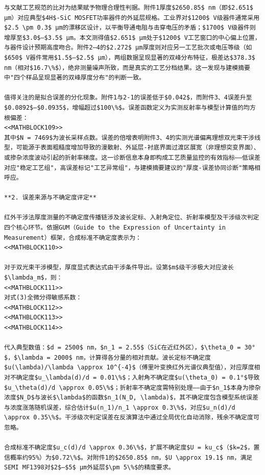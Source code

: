 \documentclass{mcmthesis}
\begin{document}
\begin{table}[htbp]
\begin{lstlisting}
与文献工艺规范的比对为结果赋予物理合理性判据。附件1厚度$2650.85$ nm（即$2.651$ μm）对应典型$4H$-SiC MOSFET功率器件的外延层规格。工业界对$1200$ V级器件通常采用$2.5 \pm 0.3$ μm的漂移区设计，以平衡导通电阻与击穿电压的矛盾；$1700$ V级器件则增厚至$3.0$–$3.5$ μm。本文测得值$2.651$ μm处于$1200$ V工艺窗口的中心偏上位置，与器件设计预期高度吻合。附件2–4的$2.272$ μm厚度则对应另一工艺批次或电压等级（如$650$ V器件常用$1.5$–$2.5$ μm），两组数据呈现显著的双峰分布特征，极差达$378.3$ nm（相对$16.7\%$），绝非测量噪声所致，而是真实的工艺分档结果。这一发现与建模摘要中"四个样品呈现显著的双峰厚度分布"的判断一致。

值得关注的是拟合误差的分化现象。附件1与2-1的误差低于$0.042$，而附件3、4误差升至$0.0892$–$0.0935$，增幅超过$100\%$。误差函数定义为实测反射率与模型计算值的均方根偏差：
<<MATHBLOCK109>>
其中$N = 7469$为波长采样点数。误差的倍增表明附件3、4的实测光谱偏离理想双光束干涉线型，可能源于表面粗糙度增加导致的漫散射、外延层-衬底界面过渡区展宽（非理想突变界面）、或掺杂浓度波动引起的折射率梯度。这一诊断信息本身即构成工艺质量监控的有效指标——低误差对应"稳定工艺组"，高误差标记"工艺异常组"，与建模摘要建议的"厚度-误差协同诊断"策略相呼应。

**2. 误差来源与不确定度评定**

红外干涉法厚度测量的不确定度传播链涉及波长定标、入射角定位、折射率模型及干涉级次判定四个核心环节。依据GUM（Guide to the Expression of Uncertainty in Measurement）框架，合成标准不确定度表示为：
<<MATHBLOCK110>>

对于双光束干涉模型，厚度显式表达式由干涉条件导出。设第$m$级干涉极大对应波长$\lambda_m$，则：
<<MATHBLOCK111>>
对式(3)全微分得敏感系数：
<<MATHBLOCK112>>
<<MATHBLOCK113>>
<<MATHBLOCK114>>

代入典型数值：$d = 2500$ nm，$n_1 = 2.55$（SiC在近红外区），$\theta_0 = 30°$，$\lambda = 2000$ nm，计算得各分量的相对贡献。波长定标不确定度$u(\lambda)/\lambda \approx 10^{-4}$（傅里叶变换红外光谱仪典型值），对应厚度相对不确定度$u_\lambda(d)/d = 0.01\%$；入射角不确定度$u(\theta_0) = 0.1°$导致$u_\theta(d)/d \approx 0.05\%$；折射率不确定度需特别处理——由于$n_1$本身为掺杂浓度$N_D$与波长$\lambda$的函数$n_1(N_D, \lambda)$，其不确定度包含模型系统误差与浓度涨落随机误差，综合估计$u(n_1)/n_1 \approx 0.3\%$，对应$u_n(d)/d \approx 0.35\%$。干涉级次判定误差在反演算法中通过全局优化自动消除，残余不确定度可忽略。

合成标准不确定度$u_c(d)/d \approx 0.36\%$，扩展不确定度$U = ku_c$（$k=2$，置信概率约95%）为$0.72\%$。对附件1的$2650.85$ nm，$U \approx 19.1$ nm，满足SEMI MF1398对$2$–$5$ μm外延层$\pm 5\%$的精度要求。


\end{lstlisting}
\end{table}
\end{document}
